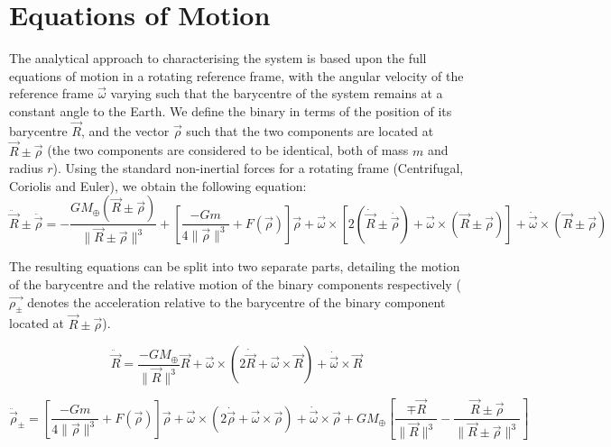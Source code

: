 \documentclass[letterpaper, preprint, paper,11pt]{AAS}	%
\begin{document}
\section{Equations of Motion}

The analytical approach to characterising the system is based upon the full equations of motion in a rotating reference frame, with the angular velocity of the reference frame $\vec{\omega}$ varying such that the barycentre of the system remains at a constant angle to the Earth. We define the binary in terms of the position of its barycentre $\vec{R}$, and the vector $\vec{\rho}$ such that the two components are located at $\vec{R}\pm\vec{\rho}$ (the two components are considered to be identical, both of mass $m$ and radius $r$). Using the standard non-inertial forces for a rotating frame (Centrifugal, Coriolis and Euler), we obtain the following equation:
\begin{equation}
\ddot{\vec{R}}\pm\ddot{\vec{\rho}} = -\frac{GM_\oplus(\vec{R}\pm\vec{\rho})}{\|\vec{R}\pm\vec{\rho}\|^{3}} + \left[\frac{-Gm}{4\|\vec{\rho}\|^{3}}+F(\vec{\rho})\right]\vec{\rho} +  \vec{\omega}\times[2(\dot{\vec{R}}\pm\dot{\vec{\rho}}) + \vec{\omega}\times(\vec{R}\pm\vec{\rho})]+\dot{\vec{\omega}}\times(\vec{R}\pm\vec{\rho}) 
\end{equation}

The resulting equations can be split into two separate parts, detailing the motion of the barycentre and the relative motion of the binary components respectively ($\vec{\rho_{\pm}}$ denotes the acceleration relative to the barycentre of the binary component located at $\vec{R}\pm\vec{\rho}$).
 
\begin{equation}
\ddot{\vec{R}} = \frac{-GM_\oplus}{\|\vec{R}\|^{3}}\vec{R}+\vec{\omega}\times(2\dot{\vec{R}}+\vec{\omega}\times\vec{R})+\dot{\vec{\omega}}\times\vec{R}
\end{equation}

\begin{equation}
\ddot{\vec{\rho}}_{\pm} = \left[\frac{-Gm}{4\|\vec{\rho}\|^{3}}+F(\vec{\rho})\right]\vec{\rho}+\vec{\omega}\times(2\dot{\vec{\rho}}+\vec{\omega}\times\vec{\rho})+\dot{\vec{\omega}}\times\vec{\rho}+{GM_\oplus}\left[\frac{\mp\vec{R}}{\|\vec{R}\|^{3}}-\frac{\vec{R}\pm\vec{\rho}}{\|\vec{R}\pm\vec{\rho}\|^{3}}\right]
\end{equation}
\end{document}
